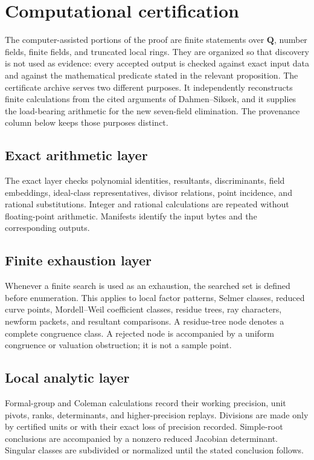 \documentclass[11pt]{article}
\newcommand{\Q}{\mathbf Q}
\theoremstyle{definition}
\theoremstyle{remark}
\begin{document}
\section{Computational certification}

The computer-assisted portions of the proof are finite statements over
$\Q$, number fields, finite fields, and truncated local rings.  They are
organized so that discovery is not used as evidence: every accepted output
is checked against exact input data and against the mathematical predicate
stated in the relevant proposition.  The certificate archive serves two
different purposes.  It independently reconstructs finite calculations from
the cited arguments of Dahmen--Siksek, and it supplies the load-bearing arithmetic
for the new seven-field elimination.  The provenance column below keeps
those purposes distinct.

\subsection{Exact arithmetic layer}

The exact layer checks polynomial identities, resultants, discriminants,
field embeddings, ideal-class representatives, divisor relations, point
incidence, and rational substitutions.  Integer and rational calculations
are repeated without floating-point arithmetic.  Manifests identify the
input bytes and the corresponding outputs.

\subsection{Finite exhaustion layer}

Whenever a finite search is used as an exhaustion, the searched set is
defined before enumeration.  This applies to local factor patterns, Selmer
classes, reduced curve points, Mordell--Weil coefficient classes, residue
trees, ray characters, newform packets, and resultant comparisons.  A
residue-tree node denotes a complete congruence class.  A rejected node is
accompanied by a uniform congruence or valuation obstruction; it is not a
sample point.

\subsection{Local analytic layer}

Formal-group and Coleman calculations record their working precision,
unit pivots, ranks, determinants, and higher-precision replays.  Divisions
are made only by certified units or with their exact loss of precision
recorded.  Simple-root conclusions are accompanied by a nonzero reduced
Jacobian determinant.  Singular classes are subdivided or normalized until
the stated conclusion follows.
\end{document}
